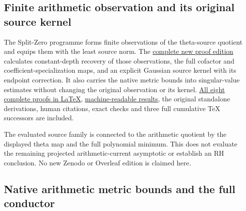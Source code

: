 \documentclass[
]{article}
\begin{document}
\subsection{Finite arithmetic observation and its original source
kernel}\label{finite-arithmetic-observation-and-its-original-source-kernel}

The Split-Zero programme forms finite observations of the theta-source
quotient and equips them with the least source norm. The
\href{https://github.com/KokunoYumeto/zeta-function-research-reader/blob/main/workbenches/splitzero-tandem/continuations/20260920-original-observation-source-kernel/README.md}{complete
new proof edition} calculates constant-depth recovery of those
observations, the full cofactor and coefficient-specialization maps, and
an explicit Gaussian source kernel with its endpoint correction. It also
carries the native metric bounds into singular-value estimates without
changing the original observation or its kernel.
\href{https://github.com/KokunoYumeto/zeta-function-research-reader/blob/main/workbenches/splitzero-tandem/continuations/20260920-original-observation-source-kernel/COMPLETE_PROOFS.tex}{All
eight complete proofs in LaTeX},
\href{https://github.com/KokunoYumeto/zeta-function-research-reader/blob/main/workbenches/splitzero-tandem/continuations/20260920-original-observation-source-kernel/RESULT_INDEX.json}{machine-readable
results}, the original standalone derivations, human citations, exact
checks and three full cumulative TeX successors are included.

The evaluated source family is connected to the arithmetic quotient by
the displayed theta map and the full polynomial minimum. This does not
evaluate the remaining projected arithmetic-current asymptotic or
establish an RH conclusion. No new Zenodo or Overleaf edition is claimed
here.

\subsection{Native arithmetic metric bounds and the full
conductor}\label{native-arithmetic-metric-bounds-and-the-full-conductor}
\end{document}

